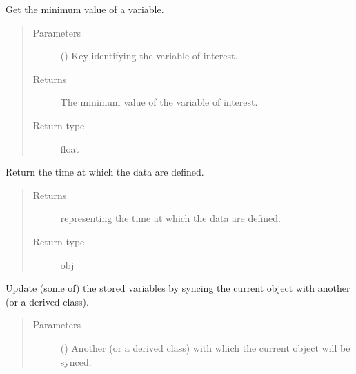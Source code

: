 \documentclass[letterpaper,10pt,english]{sphinxmanual}
\begin{document}
\begin{fulllineitems}

\begin{fulllineitems}
\label{\detokenize{api:storages.grid_data.GridData.get_min}}
Get the minimum value of a variable.
\begin{quote}\begin{description}
\item[{Parameters}] \leavevmode
{} () \textendash{} Key identifying the variable of interest.

\item[{Returns}] \leavevmode
The minimum value of the variable of interest.

\item[{Return type}] \leavevmode
float

\end{description}\end{quote}

\end{fulllineitems}


\begin{fulllineitems}
\label{\detokenize{api:storages.grid_data.GridData.time}}
Return the time at which the data are defined.
\begin{quote}\begin{description}
\item[{Returns}] \leavevmode
{} representing the time at which the data are defined.

\item[{Return type}] \leavevmode
obj

\end{description}\end{quote}

\end{fulllineitems}


\begin{fulllineitems}
\label{\detokenize{api:storages.grid_data.GridData.update}}
Update (some of) the stored variables by syncing the current object with another {\hyperref[\detokenize{api:storages.grid_data.GridData}]{}}
(or a derived class).
\begin{quote}\begin{description}
\item[{Parameters}] \leavevmode
{} () \textendash{} Another {\hyperref[\detokenize{api:storages.grid_data.GridData}]{}} (or a derived class) with which the current object will be synced.


\end{description}
\end{quote}
\end{fulllineitems}
\end{fulllineitems}
\end{document}
